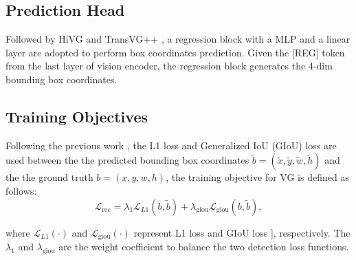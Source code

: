 \subsection{Prediction Head}
Followed by HiVG \cite{xiao2024hivg} and TransVG++ \cite{transvg++}, a regression block with a MLP and a linear layer are adopted to perform box coordinates prediction. Given the [REG] token from the last layer of vision encoder, the regression block generates the 4-dim bounding box coordinates.

\subsection{Training Objectives}
Following the previous work \cite{deng2021transvg,liu2024dara}, the L1 loss and Generalized IoU (GIoU) loss are used between the the predicted bounding box coordinates $\tilde{b} = (\tilde{x}, \tilde{y}, \tilde{w}, \tilde{h})$ and the the ground truth ${b} = ({x}, {y}, {w}, {h})$, the training objective for VG is defined as follows:
\begin{equation}
\mathcal{L}_{\text{rec}} = \lambda_1 \mathcal{L}_{L1}(b, \tilde{b}) + \lambda_{\text{giou}} \mathcal{L}_{\text{giou}}(b, \tilde{b}),
\end{equation}



\noindent
where $\mathcal{L}_{L1}(\cdot)$ and $\mathcal{L}_{\text{giou}}(\cdot)$ represent L1 loss and GIoU loss \cite{rezatofighi2019generalized}], respectively. The $\lambda_1$ and $\lambda_{\text{giou}}$ are the weight coefficient to balance the two detection loss functions.





